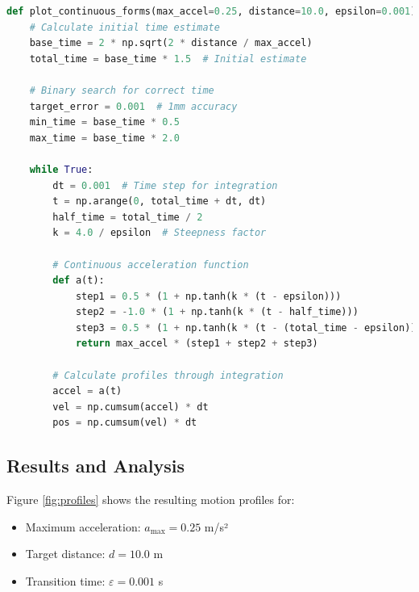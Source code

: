 \documentclass[12pt,a4paper]{article}
\begin{document}
\begin{lstlisting}[language=Python, caption=Core implementation of motion profiles]
def plot_continuous_forms(max_accel=0.25, distance=10.0, epsilon=0.001):
    # Calculate initial time estimate
    base_time = 2 * np.sqrt(2 * distance / max_accel)
    total_time = base_time * 1.5  # Initial estimate
    
    # Binary search for correct time
    target_error = 0.001  # 1mm accuracy
    min_time = base_time * 0.5
    max_time = base_time * 2.0
    
    while True:
        dt = 0.001  # Time step for integration
        t = np.arange(0, total_time + dt, dt)
        half_time = total_time / 2
        k = 4.0 / epsilon  # Steepness factor
        
        # Continuous acceleration function
        def a(t):
            step1 = 0.5 * (1 + np.tanh(k * (t - epsilon)))
            step2 = -1.0 * (1 + np.tanh(k * (t - half_time)))
            step3 = 0.5 * (1 + np.tanh(k * (t - (total_time - epsilon))))
            return max_accel * (step1 + step2 + step3)
        
        # Calculate profiles through integration
        accel = a(t)
        vel = np.cumsum(accel) * dt
        pos = np.cumsum(vel) * dt
\end{lstlisting}

\subsection{Results and Analysis}
Figure \ref{fig:profiles} shows the resulting motion profiles for:
\begin{itemize}
\item Maximum acceleration: $a_{\text{max}} = 0.25$ m/s²
\item Target distance: $d = 10.0$ m
\item Transition time: $\varepsilon = 0.001$ s
\end{itemize}
\end{document}
